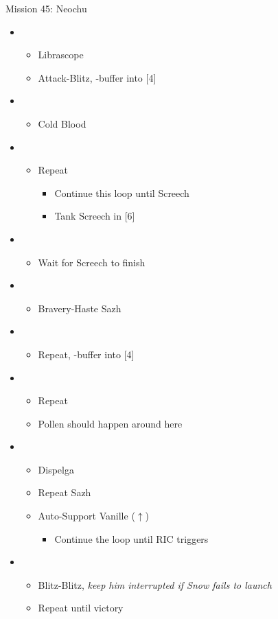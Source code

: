 \begin{battle}{Mission 45: Neochu}
	\begin{itemize}
		\item \second
			\begin{itemize}
				\item Librascope
				\item Attack-Blitz, \rav-buffer into [4]
			\end{itemize}
		\item \fourth
			\begin{itemize}
				\item Cold Blood
			\end{itemize}
		\item \third
			\begin{itemize}
				\item Repeat
					\begin{itemize}
						\item Continue this loop until Screech
						\item Tank Screech in [6]
					\end{itemize}
			\end{itemize}		
		\item \sixth
			\begin{itemize}
				\item Wait for Screech to finish
			\end{itemize}
		\item \fifth
			\begin{itemize}
				\item Bravery-Haste Sazh
			\end{itemize}
		\item \second
			\begin{itemize}
				\item Repeat, \rav-buffer into [4]
			\end{itemize}
		\item \fourth
			\begin{itemize}
				\item Repeat
				\item Pollen should happen around here
			\end{itemize}
		\item \fifth
			\begin{itemize}
				\item Dispelga
				\item Repeat Sazh
				\item Auto-Support Vanille ($\uparrow$)
					\begin{itemize}
						\item Continue the loop until RIC triggers
					\end{itemize}
			\end{itemize}
		\item \first
			\begin{itemize}
				\item Blitz-Blitz, \textit{keep him interrupted if Snow fails to launch}
				\item Repeat until victory
			\end{itemize}
	\end{itemize}
\end{battle}

